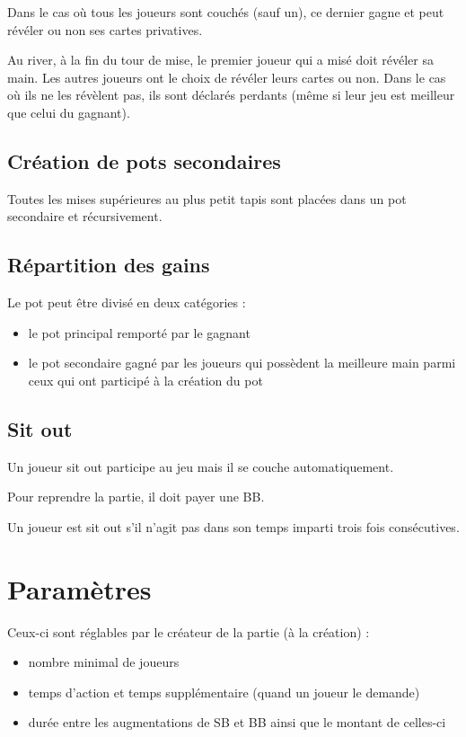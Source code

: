 Dans le cas où tous les joueurs sont couchés (sauf un), ce dernier gagne et peut révéler ou non ses cartes privatives.

Au river, à la fin du tour de mise, le premier joueur qui a misé doit révéler sa main.
Les autres joueurs ont le choix de révéler leurs cartes ou non.
Dans le cas où ils ne les révèlent pas, ils sont déclarés perdants (même si leur jeu est meilleur que celui du gagnant).

\subsection{Création de pots secondaires}

Toutes les mises supérieures au plus petit tapis sont placées dans un pot secondaire et récursivement.

\subsection{Répartition des gains}

Le pot peut être divisé en deux catégories :
\begin{itemize}
	\item le pot principal remporté par le gagnant
	\item le pot secondaire gagné par les joueurs qui possèdent la meilleure main parmi ceux qui ont participé à la création du pot
\end{itemize}

\subsection{Sit out}

Un joueur sit out participe au jeu mais il se couche automatiquement.

Pour reprendre la partie, il doit payer une BB.

Un joueur est sit out s'il n'agit pas dans son temps imparti trois fois consécutives.

\section{Paramètres}

Ceux-ci sont réglables par le créateur de la partie (à la création) :

\begin{itemize}
	\item nombre minimal de joueurs
	\item temps d'action et temps supplémentaire (quand un joueur le demande)
	\item durée entre les augmentations de SB et BB ainsi que le montant de celles-ci
\end{itemize}

